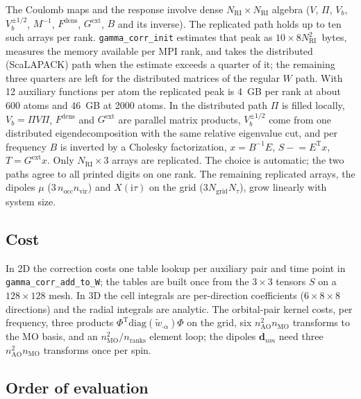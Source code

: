\documentclass[%
 reprint,
superscriptaddress,
 amsmath,amssymb,
 aps,
prb,
]{revtex4-2}
\newcommand{\ii}{\mathrm{i}}
\newcommand{\Tr}{\mathrm{T}}
\newcommand{\occ}{\mathrm{occ}}
\newcommand{\vir}{\mathrm{vir}}
\newcommand{\dens}{\mathrm{dens}}
\newcommand{\ext}{\mathrm{ext}}
\begin{document}
The Coulomb maps and the response involve dense $N_\mathrm{RI}\times N_\mathrm{RI}$ algebra
($V$, $\Pi$, $V_b$, $V_b^{\pm1/2}$, $M^{-1}$, $F^\dens$, $G^\ext$, $B$ and its inverse). The
replicated path holds up to ten such arrays per rank. \texttt{gamma\_corr\_init} estimates that
peak as $10\times8N_\mathrm{RI}^2$~bytes, measures the memory available per MPI rank, and takes
the distributed (ScaLAPACK) path when the estimate exceeds a quarter of it; the remaining
three quarters are left for the distributed matrices of the regular $W$ path. With 12 auxiliary
functions per atom the replicated peak is 4~GB per rank at about 600 atoms and 46~GB at 2000
atoms. In the distributed path $\Pi$ is filled locally, $V_b = \Pi V\Pi$, $F^\dens$ and $G^\ext$
are parallel matrix products, $V_b^{\pm1/2}$ come from one distributed eigendecomposition with
the same relative eigenvalue cut, and per frequency $B$ is inverted by a Cholesky factorization,
$x = B^{-1}E$, $S \mathrel{-}= E^\Tr x$, $T = G^\ext x$. Only $N_\mathrm{RI}\times3$ arrays are
replicated. The choice is automatic; the two paths agree to all printed digits on one rank.
The remaining replicated arrays, the dipoles $\mu$ ($3\,n_\occ n_\vir$) and $X(\ii\tau)$ on the
grid ($3N_\mathrm{grid}N_\tau$), grow linearly with system size.

\subsection{Cost}
\label{sec:cost}

In 2D the correction costs one table lookup per auxiliary pair and time point in
\texttt{gamma\_corr\_add\_to\_W}; the tables are built once from the $3\times3$ tensors $S$ on a
$128\times128$ mesh. In 3D the cell integrals are per-direction coefficients
($6\times8\times8$ directions) and the radial integrals are analytic. The orbital-pair kernel
costs, per frequency, three products $\Phi^\Tr\mathrm{diag}(\tilde w_{\cdot\alpha})\Phi$ on the
grid, six $n_\mathrm{AO}^2n_\mathrm{MO}$ transforms to the MO basis, and an
$n_\mathrm{MO}^2/n_\mathrm{ranks}$ element loop; the dipoles $\mathbf d_{nm}$ need three
$n_\mathrm{AO}^2n_\mathrm{MO}$ transforms once per spin.

\subsection{Order of evaluation}
\label{sec:order}
\end{document}

